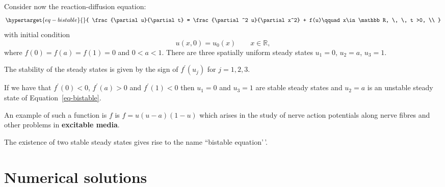 \documentclass[
  letterpaper,
  DIV=11,
  numbers=noendperiod]{scrreprt}
\theoremstyle{plain}
\theoremstyle{definition}
\theoremstyle{plain}
\theoremstyle{remark}
\begin{document}
Consider now the reaction-diffusion equation:
\begin{equation}\protect\hypertarget{eq-bistable}{}{
 \frac{\partial u}{\partial t} = \frac{\partial^2 u}{\partial x^2} +   f(u)\qquad x\in \mathbb R, \, \, t >0,  \\
}\label{eq-bistable}\end{equation} with initial condition \[
u(x,0)=u_0(x)  \qquad x\in \mathbb R,
\] where \(f(0) = f(a) = f(1)= 0\) and \(0 < a<1\). There are three
spatially uniform steady states \(u_1 =0\), \(u_2 =a\), \(u_3=1\).

The stability of the steady states is given by the sign of
\(f^\prime(u_j)\) for \(j =1,2,3\).

If we have that \(f^\prime (0) < 0\), \(f^\prime(a) >0\) and
\(f^\prime(1) <0\) then \(u_1=0\) and \(u_3=1\) are stable steady states
and \(u_2 =a\) is an unstable steady state of
Equation~\ref{eq-bistable}.

An example of such a function is \(f\) is \(f=u(u-a)(1-u)\) which arises
in the study of nerve action potentials along nerve fibres and other
problems in \textbf{excitable media}.

The existence of two stable steady states gives rise to the name
``bistable equation'\,'.

\hypertarget{numerical-solutions-2}{%
\section{Numerical solutions}\label{numerical-solutions-2}}
\end{document}
